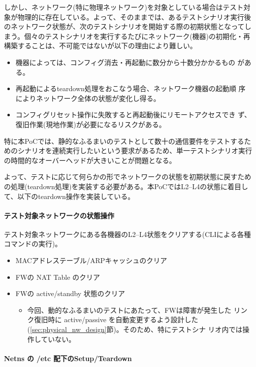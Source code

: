 しかし、ネットワーク(特に物理ネットワーク)を対象としている場合はテスト対
象が物理的に存在している。よって、そのままでは、あるテストシナリオ実行後
のネットワーク状態が、次のテストシナリオを開始する際の初期状態となってし
まう。個々のテストシナリオを実行するたびにネットワーク(機器)の初期化・再
構築することは、不可能ではないが以下の理由により難しい。
\begin{itemize}
 \item 機器によっては、コンフィグ消去・再起動に数分から十数分かかるもの
       がある。
 \item 再起動によるteardown処理をおこなう場合、ネットワーク機器の起動順
       序によりネットワーク全体の状態が変化し得る。
 \item コンフィグリセット操作に失敗すると再起動後にリモートアクセスでき
       ず、復旧作業(現地作業)が必要になるリスクがある。
\end{itemize}
特に本PoCでは、静的なふるまいのテストとして数十の通信要件をテストするた
めのシナリオを連続実行したいという要求があるため、単一テストシナリオ実行
の時間的なオーバーヘッドが大きいことが問題となる。

よって、テストに応じて何らかの形でネットワークの状態を初期状態に戻すため
の処理(teardown処理)を実装する必要がある。本PoCではL2--L4の状態に着目し
て、以下のteardown操作を実装している。

    \paragraph{テスト対象ネットワークの状態操作}
テスト対象ネットワークにある各機器のL2--L4状態をクリアする(CLIによる各種
コマンドの実行)。
\begin{itemize}
 \item MACアドレステーブル/ARPキャッシュのクリア
 \item FWの NAT Table のクリア
 \item FWの active/standby 状態のクリア
       \begin{itemize}
        \item 今回、動的なふるまいのテストにあたって、FWは障害が発生した
              リンク復旧時に active/passive を自動変更するよう設計した
              (\ref{sec:physical_nw_design}節)。そのため、特にテストシナ
              リオ内では操作していない。
       \end{itemize}
\end{itemize}

    \paragraph{Netns の /etc 配下のSetup/Teardown}

